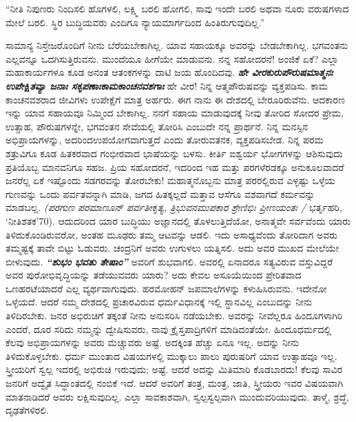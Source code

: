 “ನೀತಿ ನಿಪುಣರು ನಿಂದಿಸಲಿ ಹೊಗಳಲಿ, ಲಕ್ಷ್ಮಿ ಬರಲಿ ಹೋಗಲಿ, ಸಾವು ಇಂದೇ ಬರಲಿ ಅಥವಾ ನೂರು ವರುಷಗಳಾದ ಮೇಲೆ ಬರಲಿ. ಸ್ಥಿರ ಬುದ್ಧಿಯವರು ಎಂದಿಗೂ ನ್ಯಾಯಮಾರ್ಗದಿಂದ ಹಿಂತಿರುಗುವುದಿಲ್ಲ.”

ಸಾಮಾನ್ಯ ನಿಸ್ತೇಜರೊಂದಿಗೆ ನೀನು ಬೆರೆಯಬೇಕಾಗಿಲ್ಲ. ಯಾವ ಸಹಾಯಕ್ಕೂ ಅವರನ್ನು ಬೇಡಬೇಕಾಗಿಲ್ಲ. ಭಗವಂತನು ಎಲ್ಲವನ್ನೂ ಒದಗಿಸುತ್ತಿರುವನು. ಮುಂದೆಯೂ ಹೀಗೆಯೇ ಮಾಡುವನು. ನನ್ನ ಸಹೋದರನೆ! ಅಂಜಿಕೆ ಏಕೆ? ಎಲ್ಲಾ ಮಹಾಕಾರ್ಯಗಳೂ ಕೂಡ ಅನಂತ ಆತಂಕಗಳನ್ನು ದಾಟಿ ಜಯ ಹೊಂದಿದವು. \textbf{\textit{ಹೇ ವೀರಕುರುಪೌರುಷಮಾತ್ಮನಃ ಉಪೇಕ್ಷಿತವ್ಯಾ ಜನಾಃ ಸಕೃಪಣಾಃಕಾಮಕಾಂಚನವಶಗಾಃ}}\enginline{-} ಹೇ ವೀರ! ನಿನ್ನ ಆತ್ಮಪೌರುಷವನ್ನು ವ್ಯಕ್ತಪಡಿಸು. ಕಾಮ ಕಾಂಚನವಶರಾದ ಜೀವಿಗಳು ಉಪೇಕ್ಷೆಗೆ ಮಾತ್ರ ಅರ್ಹರು. ಈಗ ನಾನು ಈ ದೇಶದಲ್ಲಿ ಬೇರೂರಿರುವೆನು. ಆದಕಾರಣ ಇನ್ನು ಯಾವ ಸಹಾಯವೂ ನಿಮ್ಮಿಂದ ಬೇಕಾಗಿಲ್ಲ. ನನಗೆ ಸಹಾಯ ಮಾಡುವುದಕ್ಕೆ ನೀವು ತೋರಿದ ಸೋದರ ಪ್ರೇಮ, ಉತ್ಸಾಹ, ಪೌರುಷಗಳನ್ನೇ, ಭಗವಂತನ ಸೇವೆಯಲ್ಲಿ ತೋರಿಸಿ ಎಂಬುದೇ ನನ್ನ ಪ್ರಾರ್ಥನೆ. ನಿನ್ನ ಮನಸ್ಸಿನ ಅಭಿಪ್ರಾಯಗಳನ್ನು, ಅದರಿಂದಉಪಯೋಗವಾಗುತ್ತದೆ ಎಂದು ತೋರುವತನಕ, ವ್ಯಕ್ತಪಡಿಸಬೇಡ. ನಿನ್ನ ಪರಮ ಶತ್ರುವಿಗೂ ಕೂಡ ಹಿತಕರವಾದ ಗಂಭೀರವಾದ ಭಾಷೆಯನ್ನು ಬಳಸು. ಕೀರ್ತಿ ಐಶ್ವರ್ಯ ಭೋಗಗಳನ್ನು ಆಶಿಸುವುದು ಪ್ರತಿಯೊಬ್ಬ ಮಾನವನಿಗೂ ಸಹಜ. ಪ್ರಿಯ ಸಹೋದರನೆ, ಇದರಿಂದ ಇಹ ಮತ್ತು ಪರಗಳೆರಡಕ್ಕೂ ಅನುಕೂಲವಾದರೆ ಜನರೆಲ್ಲ ಏಕೆ ಇಷ್ಟೊಂದು ಸಡಗರವನ್ನು ತೋರಬೇಕು! ಮಹಾತ್ಮನೊಬ್ಬನು ಮಾತ್ರ ಪರರಲ್ಲಿರುವ ಎಳ್ಳಷ್ಟು ಒಳ್ಳೆಯ ಗುಣವನ್ನು ಒಂದು ಪರ್ವತವನ್ನಾಗಿ ಮಾಡಿ, ಜಗದ ಹಿತಕ್ಕಲ್ಲದೆ ಮತ್ತಾವ ಆಸೆಗೂ ವಶವಾಗದೆ ಕರ್ಮವನ್ನು ಮಾಡಬಲ್ಲ. \textit{(ಪರಗುಣ ಪರಮಾಣೂನ್ ಪರ್ವತೀಕೃತ್ಯ, ತ್ರಿಭುವನಮುಪಕಾರ ಶ್ರೇಣಿಭಿಃ ಪ್ರೀಣಯಂತಃ /}\enginline{-} ಭರ್ತೃಹರಿ, ‘ನೀತಿಶತಕ’\enginline{-}70). ಆದುದರಿಂದ ಯಾರ ಬುದ್ಧಿಯು ಅಜ್ಞಾನದಲ್ಲಿ ತೊಳಲುತ್ತಿದೆಯೋ, ಅನಾತ್ಮವೇ ಸರ್ವವೆಂದು ಯಾರು ತಿಳಿದುಕೊಂಡಿರುವರೋ, ಅಂತಹ ಮೂಢರು ತಮ್ಮ ಆಟವನ್ನು ಆಡಲಿ. ಇದು ಅಸಾಧ್ಯವೆಂದು ತೋರಿದಾಗ ಅವರು ತಮ್ಮಷ್ಟಕ್ಕೆ ತಾವೇ ಬಿಟ್ಟು ಓಡುವರು. ಚಂದ್ರನಿಗೆ ಅವರು ಉಗುಳಲು ಯತ್ನಿಸಲಿ. ಅದು ಅವರ ಮುಖದ ಮೇಲೆಯೇ ಬೀಳುವುದು. \textbf{\textit{ “ಶುಭಂ ಭವತು ತೇಷಾಂ” }} ಅವರಿಗೆ ಶುಭವಾಗಲಿ. ಅವರಲ್ಲಿ ಏನಾದರೂ ಸತ್ಯವಿರುವ ವಸ್ತುವಿದ್ದರೆ ಅವರ ಪುರೋಭಿವೃದ್ಧಿಯನ್ನು ತಡೆಯುವವರು ಯಾರು? ಅದು ಕೇವಲ ಅಸೂಯೆಯಿಂದ ಪ್ರೇರಿತವಾದ ಒಣಹರಟೆಯಾದರೆ ಎಲ್ಲ ವ್ಯರ್ಥವಾಗುವುದು. ಹರಮೋಹನ್ ಜಪಮಾಲೆಗಳನ್ನು ಕಳುಹಿಸಿರುವನು. ಇದೇನೋ ಒಳ್ಳೆಯದೆ. ಆದರೆ ನಮ್ಮ ದೇಶದಲ್ಲಿ ಪ್ರಚಾರವಿರುವ ಧರ್ಮವಿಧಾನಕ್ಕೆ ಇಲ್ಲಿ ಸ್ಥಾನವಿಲ್ಲ ಎಂಬುದನ್ನು ನೀನು ತಿಳಿದಿರಬೇಕು. ಜನರ ಅಭಿರುಚಿಗೆ ತಕ್ಕಂತೆ ನೀನು ಅನುಸರಿಸಿ ನಡೆಯಬೇಕು. ಅವರನ್ನು ನೀವೆಲ್ಲರೂ ಹಿಂದೂಗಳಾಗಿರಿ ಎಂದರೆ, ದೂರ ಸರಿದು ನಮ್ಮನ್ನು ದ್ವೇಷಿಸುವರು, ನಾವು ಕ್ರೈಸ್ತಪಾದ್ರಿಗಳಿಗೆ ಮಾಡಿದಂತೆಯೇ. ಹಿಂದೂಧರ್ಮದಲ್ಲಿ ಕೆಲವು ಅಭಿಪ್ರಾಯಗಳನ್ನು ಅವರು ಮೆಚ್ಚುವರು ಅಷ್ಟೆ. ಅದಕ್ಕಿಂತ ಹೆಚ್ಚು ಏನೂ ಇಲ್ಲ. ಅದನ್ನು ನೀನು ತಿಳಿದುಕೊಳ್ಳಬೇಕು. ಧರ್ಮ ಮುಂತಾದ ವಿಷಯಗಳಲ್ಲಿ ಮುಕ್ಕಾಲು ಪಾಲು ಪುರುಷರಿಗೆ ಯಾವ ಉತ್ಸಾಹವೂ ಇಲ್ಲ. ಸ್ತ್ರೀಯರಿಗೆ ಸ್ವಲ್ಪ ಇದರಲ್ಲಿ ಅಭಿರುಚಿ ಇರುವುದು; ಅಷ್ಟೆ. ಆದರೆ ಅದನ್ನು ಮಿತಿಮಾರಿ ಕೊಡಬಾರದು! ಕೆಲವು ಸಾವಿರ ಜನರಿಗೆ ಅದ್ವೈತ ಸಿದ್ಧಾಂತದಲ್ಲಿ ನಂಬಿಕೆ ಇದೆ. ಆದರೆ ಅವರಿಗೆ ತಂತ್ರ, ಮಂತ್ರ, ಜಾತಿ, ಸ್ತ್ರೀಯರು ಇವರ ವಿಷಯವಾಗಿ ಮಾತನಾಡಿದರೆ ಅವರು ಲಕ್ಷಿಸುವುದಿಲ್ಲ. ಎಲ್ಲಾ ಸಾವಕಾಶವಾಗಿ, ಸ್ವಲ್ಪಸ್ವಲ್ಪವಾಗಿ ಮುಂದುವರಿಯುವುದು. ತಾಳ್ಮೆ, ಶ್ರದ್ಧೆ, ದೃಢತೆ\-ಗಳಿರಲಿ.
\vspace{-0.5cm}

